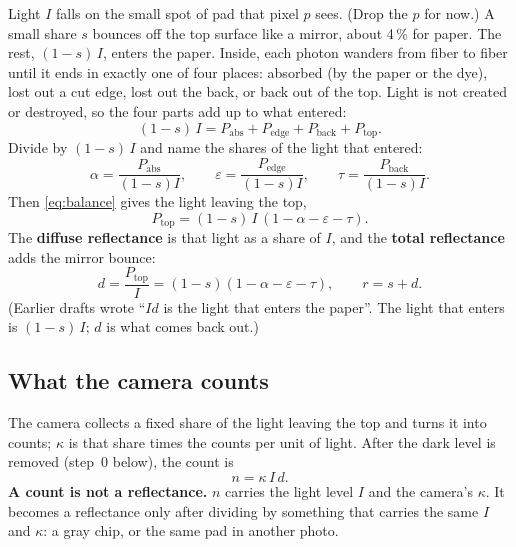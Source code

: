 \documentclass[11pt,letter]{article}
\begin{document}
Light $I$ falls on the small spot of pad that pixel $p$ sees.  (Drop the
$p$ for now.)  A small share $s$ bounces off the top surface like a mirror,
about 4\,\% for paper.  The rest, $(1 - s)\,I$, enters the paper.  Inside,
each photon wanders from fiber to fiber until it ends in exactly one of four
places: absorbed (by the paper or the dye), lost out a cut edge, lost out
the back, or back out of the top.  Light is not created or destroyed, so the
four parts add up to what entered:
\begin{equation}
  (1 - s)\, I = P_\text{abs} + P_\text{edge} + P_\text{back} + P_\text{top} .
  \label{eq:balance}
\end{equation}
Divide by $(1 - s)\,I$ and name the shares of the light that entered:
\begin{equation}
  \alpha = \frac{P_\text{abs}}{(1-s)I}, \qquad
  \varepsilon = \frac{P_\text{edge}}{(1-s)I}, \qquad
  \tau = \frac{P_\text{back}}{(1-s)I} .
\end{equation}
Then \eqref{eq:balance} gives the light leaving the top,
\begin{equation}
  P_\text{top} = (1 - s)\, I\, (1 - \alpha - \varepsilon - \tau) .
\end{equation}
The \textbf{diffuse reflectance} is that light as a share of $I$, and the
\textbf{total reflectance} adds the mirror bounce:
\begin{equation}
  d = \frac{P_\text{top}}{I} = (1 - s)(1 - \alpha - \varepsilon - \tau),
  \qquad r = s + d .
  \label{eq:d}
\end{equation}
(Earlier drafts wrote ``$I d$ is the light that enters the paper''.  The light
that enters is $(1-s)\,I$; $d$ is what comes back out.)

\subsection{What the camera counts}

The camera collects a fixed share of the light leaving the top and turns it
into counts; $\kappa$ is that share times the counts per unit of light.
After the dark level is removed (step~0 below), the count is
\begin{equation}
  n = \kappa\, I\, d .
  \label{eq:count}
\end{equation}
\textbf{A count is not a reflectance.}  $n$ carries the light level $I$ and
the camera's $\kappa$.  It becomes a reflectance only after dividing by
something that carries the same $I$ and $\kappa$: a gray chip, or the same
pad in another photo.
\end{document}
